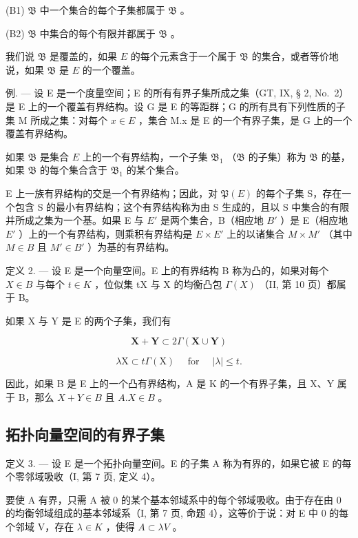 (B1) \(\mathfrak{B}\) 中一个集合的每个子集都属于 \(\mathfrak{B}\) 。

(B2) \(\mathfrak{B}\) 中集合的每个有限并都属于 \(\mathfrak{B}\) 。

我们说 \(\mathfrak{B}\) 是覆盖的，如果 \(E\) 的每个元素含于一个属于 \(\mathfrak{B}\) 的集合，或者等价地说，如果 \(\mathfrak{B}\) 是 \(E\) 的一个覆盖。

例. --- 设 E 是一个度量空间；E 的所有有界子集所成之集（GT, IX, § 2, No.~2）是 E 上的一个覆盖有界结构。设 G 是 E 的等距群；G 的所有具有下列性质的子集 M 所成之集：对每个 \(x \in E\) ，集合 M.x 是 E 的一个有界子集，是 G 上的一个覆盖有界结构。

如果 \(\mathfrak{B}\) 是集合 \(E\) 上的一个有界结构，一个子集 \(\mathfrak{B}_1\) （\(\mathfrak{B}\) 的子集）称为 \(\mathfrak{B}\) 的基，如果 \(\mathfrak{B}\) 的每个集合含于 \(\mathfrak{B}_1\) 的某个集合。

E 上一族有界结构的交是一个有界结构；因此，对 \(\mathfrak{P}(E)\) 的每个子集 S，存在一个包含 S 的最小有界结构；这个有界结构称为由 S 生成的，且以 S 中集合的有限并所成之集为一个基。如果 E 与 \(E'\) 是两个集合，B（相应地 \(B'\) ）是 E（相应地 \(E'\) ）上的一个有界结构，则乘积有界结构是 \(E \times E'\) 上的以诸集合 \(M \times M'\) （其中 \(M \in B\) 且 \(M' \in B'\) ）为基的有界结构。

定义 2. --- 设 E 是一个向量空间。E 上的有界结构 B 称为凸的，如果对每个 \(X \in B\) 与每个 \(t \in K\) ，位似集 tX 与 X 的均衡凸包 \(\Gamma(X)\) （II, 第 10 页）都属于 B。

如果 X 与 Y 是 E 的两个子集，我们有

\[
\mathbf {X} + \mathbf {Y} \subset 2 \Gamma (\mathbf {X} \cup \mathbf {Y})
\]

\[
\lambda \mathrm{X} \subset t \Gamma (\mathrm{X}) \quad \text { for } \quad | \lambda | \leqslant t.
\]

因此，如果 B 是 E 上的一个凸有界结构，A 是 K 的一个有界子集，且 X、Y 属于 B，那么 \(X + Y \in B\) 且 \(A. X \in B\) 。

\subsection{拓扑向量空间的有界子集}

定义 3. --- 设 E 是一个拓扑向量空间。E 的子集 A 称为有界的，如果它被 E 的每个零邻域吸收（I, 第 7 页, 定义 4）。

要使 A 有界，只需 A 被 0 的某个基本邻域系中的每个邻域吸收。由于存在由 0 的均衡邻域组成的基本邻域系（I, 第 7 页, 命题 4），这等价于说：对 E 中 0 的每个邻域 V，存在 \(\lambda \in K\) ，使得 \(A \subset \lambda V\) 。

